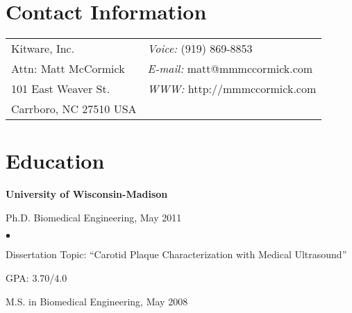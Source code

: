 \documentclass[margin,line]{res}
\newenvironment{list1}{
  \begin{list}{\ding{113}}{%
      \setlength{\itemsep}{0in}
      \setlength{\parsep}{0in} \setlength{\parskip}{0in}
      \setlength{\topsep}{0in} \setlength{\partopsep}{0in}
      \setlength{\leftmargin}{0.17in}}}{\end{list}}
\newenvironment{list2}{
  \begin{list}{$\bullet$}{%
      \setlength{\itemsep}{0in}
      \setlength{\parsep}{0in} \setlength{\parskip}{0in}
      \setlength{\topsep}{0in} \setlength{\partopsep}{0in}
      \setlength{\leftmargin}{0.2in}}}{\end{list}}
\begin{document}

\begin{resume}
\section{\sc Contact Information}
\vspace{.05in}
\begin{tabular}{@{}p{3in}p{4in}}
Kitware, Inc.                             & {\it Voice:}  (919) 869-8853 \\
Attn: Matt McCormick                      & {\it E-mail:}  matt@mmmccormick.com \\
101 East Weaver St.                       & {\it WWW:} http://mmmccormick.com\\
Carrboro, NC 27510 USA
\end{tabular}



\section{\sc Education}
{\bf University of Wisconsin-Madison} \\
\vspace*{-.1in}
\begin{list1}
\item[] Ph.D. Biomedical Engineering, May 2011
\begin{list2}
\vspace*{.05in}
\item Dissertation Topic:  ``Carotid Plaque Characterization with Medical
Ultrasound''
\item GPA: 3.70/4.0
\end{list2}
\vspace*{.05in}
\item[] M.S. in Biomedical Engineering, May 2008
\end{list1}


\end{resume}
\end{document}
